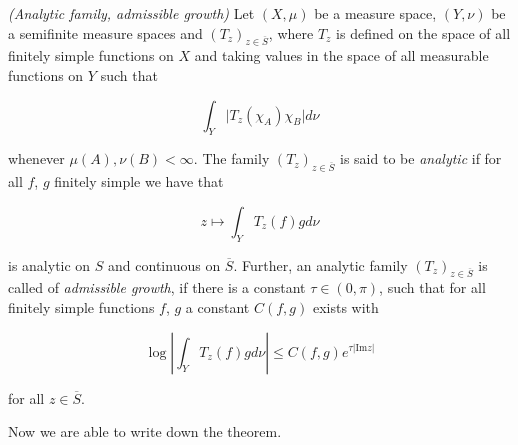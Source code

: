 \begin{mdframed}
	\begin{definition}\emph{(Analytic family, admissible growth)}
		Let $(X,\mu)$ be a measure space, $(Y,\nu)$ be a semifinite measure spaces and $\left( T_z \right)_{z \in \overline{S}}$, where $T_z$ is defined on the space of all finitely simple functions on $X$ and taking values in the space of all measurable functions on $Y$ such that

		\begin{equation}
			\int_Y \vert T_z(\chi_A)\chi_B \vert d\nu
		\end{equation}

		whenever $\mu(A),\nu(B) < \infty$. The family $\left( T_z \right)_{z \in \overline{S}}$ is said to be \emph{analytic} if for all $f$, $g$ finitely simple we have that

		\begin{equation}
			z \mapsto \int_Y T_z(f)gd\nu
		\end{equation}

		is analytic on $S$ and continuous on $\overline{S}$. Further, an analytic family $\left( T_z \right)_{z \in \overline{S}}$ is called of \emph{admissible growth}, if there is a constant $\tau \in (0,\pi)$, such that for all finitely simple functions $f$, $g$ a constant $C(f,g)$ exists with

			\begin{equation}
				\log\left\vert \int_Y T_z(f) g d\nu\right\vert \leqslant C(f,g)e^{\tau\vert \mathrm{Im}z\vert}
			\end{equation}

			for all $z \in \overline{S}$.
	\end{definition}
\end{mdframed}

\vspace{2mm}

Now we are able to write down the theorem.

\vspace{2mm}

